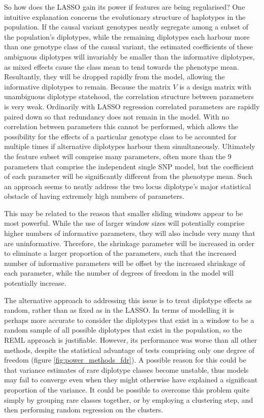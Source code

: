 So how does the LASSO gain its power if features are being regularised? One intuitive explanation concerns the evolutionary structure of haplotypes in the population. If the causal variant genotypes neatly segregate among a subset of the population's diplotypes, while the remaining diplotypes each harbour more than one genotype class of the causal variant, the estimated coefficients of these ambiguous diplotypes will invariably be smaller than the informative diplotypes, as mixed effects cause the class mean to tend towards the phenotype mean. Resultantly, they will be dropped rapidly from the model, allowing the informative diplotypes to remain. Because the matrix $V$ is a design matrix with unambiguous diplotype statehood, the correlation structure between parameters is very weak. Ordinarily with LASSO regression correlated parameters are rapidly paired down so that redundancy does not remain in the model. With no correlation between parameters this cannot be performed, which allows the possibility for the effects of a particular genotype class to be accounted for multiple times if alternative diplotypes harbour them simultaneously. Ultimately the feature subset will comprise many parameters, often more than the 9 parameters that comprise the independent single SNP model, but the coefficient of each parameter will be significantly different from the phenotype mean. Such an approach seems to neatly address the two locus diplotype's major statistical obstacle of having extremely high numbers of parameters.

This may be related to the reason that smaller sliding windows appear to be most powerful. While the use of larger window sizes will potentially comprise higher numbers of informative parameters, they will also include very many that are uninformative. Therefore, the shrinkage parameter will be increased in order to eliminate a larger proportion of the parameters, such that the increased number of informative parameters will be offset by the increased shrinkage of each parameter, while the number of degrees of freedom in the model will potentially increase.

The alternative approach to addressing this issue is to treat diplotype effects as random, rather than as fixed as in the LASSO. In terms of modelling it is perhaps more accurate to consider the diplotypes that exist in a window to be a random sample of all possible diplotypes that exist in the population, so the REML approach is justifiable. However, its performance was worse than all other methods, despite the statistical advantage of tests comprising only one degree of freedom (figure \ref{fig:power_methods_fdr}). A possible reason for this could be that variance estimates of rare diplotype classes become unstable, thus models may fail to converge even when they might otherwise have explained a significant proportion of the variance. It could be possible to overcome this problem quite simply by grouping rare classes together, or by employing a clustering step, and then performing random regression on the clusters.

